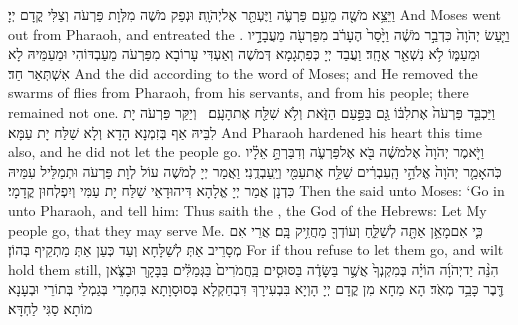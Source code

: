 {וַיֵּצֵ֥א מֹשֶׁ֖ה מֵעִ֣ם פַּרְעֹ֑ה וַיֶּעְתַּ֖ר אֶל\maqqaf יְהֹוָֽה׃}
{וּנְפַק מֹשֶׁה מִלְּוָת פַּרְעֹה וְצַלִּי קֳדָם יְיָ׃}
{And Moses went out from Pharaoh, and entreated the \lord.}{}
{וַיַּ֤עַשׂ יְהֹוָה֙ כִּדְבַ֣ר מֹשֶׁ֔ה וַיָּ֙סַר֙ הֶעָרֹ֔ב מִפַּרְעֹ֖ה מֵעֲבָדָ֣יו וּמֵעַמּ֑וֹ לֹ֥א נִשְׁאַ֖ר אֶחָֽד׃}
{וַעֲבַד יְיָ כְּפִתְגָמָא דְּמֹשֶׁה וְאַעְדִּי עָרוֹבָא מִפַּרְעֹה מֵעַבְדּוֹהִי וּמֵעַמֵּיהּ לָא אִשְׁתְּאַר חַד׃}
{And the \lord\space did according to the word of Moses; and He removed the swarms of flies from Pharaoh, from his servants, and from his people; there remained not one.}{}
{וַיַּכְבֵּ֤ד פַּרְעֹה֙ אֶת\maqqaf לִבּ֔וֹ גַּ֖ם בַּפַּ֣עַם הַזֹּ֑את וְלֹ֥א שִׁלַּ֖ח אֶת\maqqaf הָעָֽם׃ \petucha }
{וְיַקַּר פַּרְעֹה יָת לִבֵּיהּ אַף בְּזִמְנָא הָדָא וְלָא שַׁלַּח יָת עַמָּא׃}
{And Pharaoh hardened his heart this time also, and he did not let the people go.}{}
\newperek
{}%
{וַיֹּ֤אמֶר יְהֹוָה֙ אֶל\maqqaf מֹשֶׁ֔ה בֹּ֖א אֶל\maqqaf פַּרְעֹ֑ה וְדִבַּרְתָּ֣ אֵלָ֗יו כֹּֽה\maqqaf אָמַ֤ר יְהֹוָה֙ אֱלֹהֵ֣י הָֽעִבְרִ֔ים שַׁלַּ֥ח אֶת\maqqaf עַמִּ֖י וְיַֽעַבְדֻֽנִי׃}
{וַאֲמַר יְיָ לְמֹשֶׁה עוֹל לְוָת פַּרְעֹה וּתְמַלֵּיל עִמֵּיהּ כִּדְנָן אֲמַר יְיָ אֱלָהָא דִּיהוּדָאֵי שַׁלַּח יָת עַמִּי וְיִפְלְחוּן קֳדָמָי׃}
{Then the \lord\space said unto Moses: ‘Go in unto Pharaoh, and tell him: Thus saith the \lord, the God of the Hebrews: Let My people go, that they may serve Me.}{}
{כִּ֛י אִם\maqqaf מָאֵ֥ן אַתָּ֖ה לְשַׁלֵּ֑חַ וְעוֹדְךָ֖ מַחֲזִ֥יק בָּֽם׃}
{אֲרֵי אִם מְסָרֵיב אַתְּ לְשַׁלָּחָא וְעַד כְּעַן אַתְּ מַתְקֵיף בְּהוֹן׃}
{For if thou refuse to let them go, and wilt hold them still,}{}
{הִנֵּ֨ה יַד\maqqaf יְהֹוָ֜ה הוֹיָ֗ה בְּמִקְנְךָ֙ אֲשֶׁ֣ר בַּשָּׂדֶ֔ה בַּסּוּסִ֤ים בַּֽחֲמֹרִים֙ בַּגְּמַלִּ֔ים בַּבָּקָ֖ר וּבַצֹּ֑אן דֶּ֖בֶר כָּבֵ֥ד מְאֹֽד׃}
{הָא מַחָא מִן קֳדָם יְיָ הָוְיָא בִּבְעִירָךְ דִּבְחַקְלָא בְּסוּסָוָתָא בִּחְמָרֵי בְּגַמְלֵי בְּתוֹרֵי וּבְעָנָא מוֹתָא סַגִּי לַחְדָּא׃}
